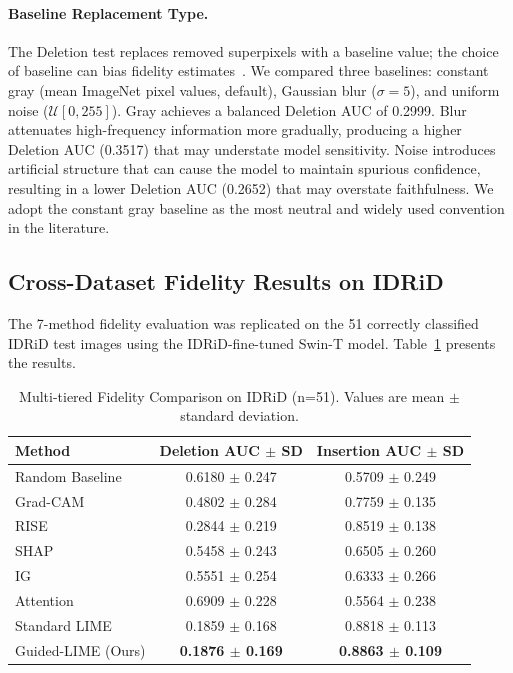 \documentclass[10pt,twoside]{article}
\begin{document}
\paragraph{Baseline Replacement Type.}
The Deletion test replaces removed superpixels with a baseline value; the choice of baseline can bias fidelity estimates~\cite{sturm2024does}. We compared three baselines: constant gray (mean ImageNet pixel values, default), Gaussian blur ($\sigma = 5$), and uniform noise ($\mathcal{U}[0, 255]$). Gray achieves a balanced Deletion AUC of 0.2999. Blur attenuates high-frequency information more gradually, producing a higher Deletion AUC (0.3517) that may understate model sensitivity. Noise introduces artificial structure that can cause the model to maintain spurious confidence, resulting in a lower Deletion AUC (0.2652) that may overstate faithfulness. We adopt the constant gray baseline as the most neutral and widely used convention in the literature.

\subsection{Cross-Dataset Fidelity Results on IDRiD}
\label{sec:idrid_results}

The 7-method fidelity evaluation was replicated on the 51 correctly classified IDRiD test images using the IDRiD-fine-tuned Swin-T model. Table~\ref{tab:idrid_fidelity} presents the results.

\begin{table}[ht]
\caption{Multi-tiered Fidelity Comparison on IDRiD (n=51). Values are mean $\pm$ standard deviation.}
\centering
\label{tab:idrid_fidelity}
\begin{tabular}{lcc}
\toprule
Method & Deletion AUC $\pm$ SD & Insertion AUC $\pm$ SD \\
\midrule
Random Baseline & 0.6180 $\pm$ 0.247 & 0.5709 $\pm$ 0.249 \\
Grad-CAM & 0.4802 $\pm$ 0.284 & 0.7759 $\pm$ 0.135 \\
RISE & 0.2844 $\pm$ 0.219 & 0.8519 $\pm$ 0.138 \\
SHAP & 0.5458 $\pm$ 0.243 & 0.6505 $\pm$ 0.260 \\
IG & 0.5551 $\pm$ 0.254 & 0.6333 $\pm$ 0.266 \\
Attention & 0.6909 $\pm$ 0.228 & 0.5564 $\pm$ 0.238 \\
Standard LIME & 0.1859 $\pm$ 0.168 & 0.8818 $\pm$ 0.113 \\
Guided-LIME (Ours) & \textbf{0.1876 $\pm$ 0.169} & \textbf{0.8863 $\pm$ 0.109} \\
\bottomrule
\end{tabular}
\end{table}
\end{document}
